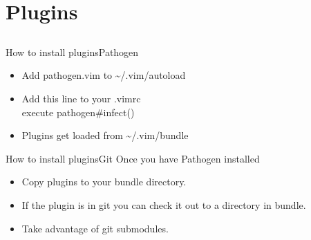 \documentclass{beamer}
\begin{document}
    \section{Plugins}
    \subsection{}
    \begin{frame}{How to install plugins}{Pathogen}
        \begin{itemize}
            \item Add pathogen.vim to \textasciitilde/.vim/autoload
            \item Add this line to your .vimrc\\
                \quad execute pathogen\#infect()
            \item Plugins get loaded from \textasciitilde/.vim/bundle
        \end{itemize}
    \end{frame}
    \begin{frame}{How to install plugins}{Git}
        Once you have Pathogen installed
        \begin{itemize}
            \item Copy plugins to your bundle directory.
            \item If the plugin is in git you can check it out to a directory in bundle.
            \item Take advantage of git submodules.
        \end{itemize}
    \end{frame}
\end{document}
